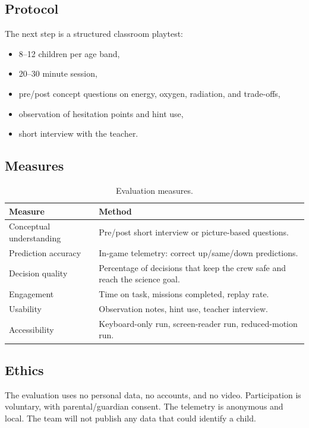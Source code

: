 \documentclass[11pt,a4paper]{article}
\begin{document}
\subsection{Protocol}

The next step is a structured classroom playtest:

\begin{itemize}
  \item 8--12 children per age band,
  \item 20--30 minute session,
  \item pre/post concept questions on energy, oxygen, radiation, and trade-offs,
  \item observation of hesitation points and hint use,
  \item short interview with the teacher.
\end{itemize}

\subsection{Measures}

\begin{table}[H]
\centering
\small
\begin{tabular}{@{}p{4.0cm}p{10.4cm}@{}}
\toprule
\textbf{Measure} & \textbf{Method}\\
\midrule
Conceptual understanding & Pre/post short interview or picture-based questions.\\
Prediction accuracy & In-game telemetry: correct up/same/down predictions.\\
Decision quality & Percentage of decisions that keep the crew safe and reach the science goal.\\
Engagement & Time on task, missions completed, replay rate.\\
Usability & Observation notes, hint use, teacher interview.\\
Accessibility & Keyboard-only run, screen-reader run, reduced-motion run.\\
\bottomrule
\end{tabular}
\caption{Evaluation measures.}
\label{tab:evaluation}
\end{table}

\subsection{Ethics}

The evaluation uses no personal data, no accounts, and no video. Participation is voluntary, with parental/guardian consent. The telemetry is anonymous and local. The team will not publish any data that could identify a child.
\end{document}
